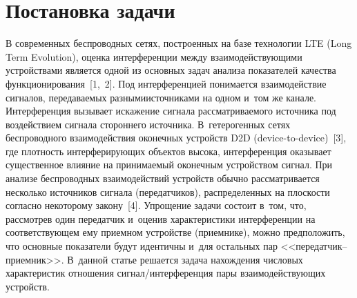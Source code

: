 \begin{multicols}{2}

\label{st\stat}

\section{Постановка задачи}

  В современных беспроводных сетях, построенных на базе технологии LTE
(Long Term Evolution), оценка интерференции между взаимодействующими
устройствами является одной из основных задач анализа показателей качества
функционирования~[1,~2]. Под интерференцией понимается взаимодействие
сигналов, передаваемых разными\linebreak источниками на одном и~том же канале.
Интерференция вызывает искажение сигнала рас\-смат\-ри\-ва\-емо\-го источника под
воздействием сигнала сторонне\-го источника. В~гетерогенных сетях
беспроводного взаимодействия оконечных устройств D2D
  (device-to-device)~[3], где плот\-ность интерферирующих объектов высока,
интерференция оказывает существенное влияние на принимаемый оконечным
устройством сигнал. При анализе беспроводных взаимодействий устройств
обычно рассматривается несколько источников сигнала (передатчиков),
распределенных на плоскости согласно некоторому закону~[4]. Упрощение
задачи состоит в~том, что, рассмотрев один передатчик и~оценив
характеристики интерференции на соответствующем ему приемном устройстве
(приемнике), можно предположить, что основные показатели будут идентичны
и~для остальных пар <<пе\-ре\-дат\-чик--при\-ем\-ник>>. В~данной статье
решается задача нахождения числовых характеристик отношения
сигнал/ин\-тер\-фе\-рен\-ция пары взаимодействующих устройств.


\end{multicols}
